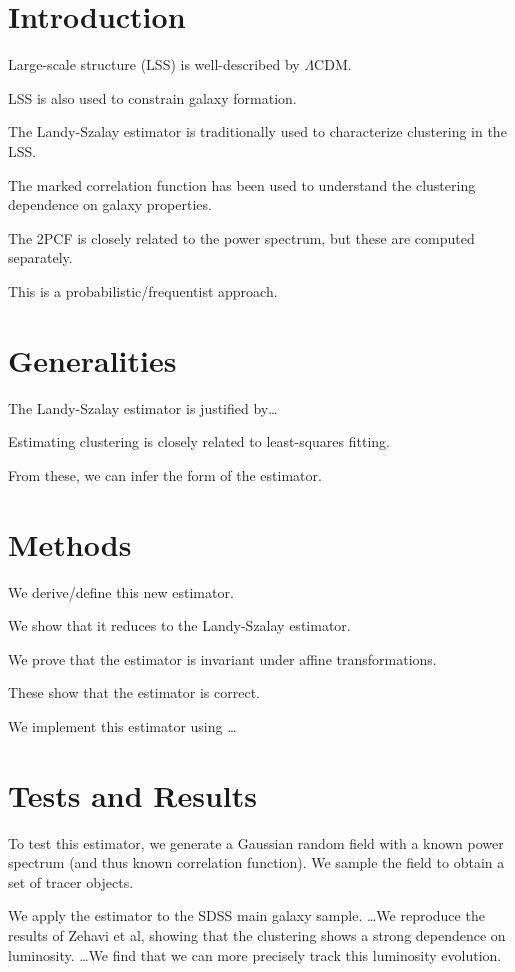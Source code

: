 \documentclass[modern]{aastex62}
\begin{document}
\section{Introduction}

Large-scale structure (LSS) is well-described by $\Lambda$CDM. 

LSS is also used to constrain galaxy formation.

The Landy-Szalay estimator is traditionally used to characterize clustering in the LSS.

The marked correlation function has been used to understand the clustering dependence on galaxy properties.

The 2PCF is closely related to the power spectrum, but these are computed separately. 

This is a probabilistic/frequentist approach.

\section{Generalities}

The Landy-Szalay estimator is justified by\ldots

Estimating clustering is closely related to least-squares fitting.

From these, we can infer the form of the estimator.

\section{Methods}

We derive/define this new estimator.

We show that it reduces to the Landy-Szalay estimator.

We prove that the estimator is invariant under affine transformations.

These show that the estimator is correct.

We implement this estimator using \ldots

\section{Tests and Results}

To test this estimator, we generate a Gaussian random field with a known power spectrum (and thus known correlation function). We sample the field to obtain a set of tracer objects.

We apply the estimator to the SDSS main galaxy sample. \ldots We reproduce the results of Zehavi et al, showing that the clustering shows a strong dependence on luminosity. \ldots We find that we can more precisely track this luminosity evolution.
\end{document}
